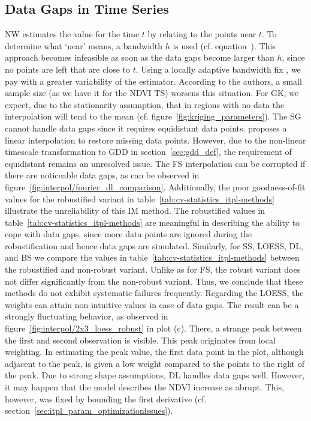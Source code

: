 {    \subsection{Data Gaps in Time Series}\label{sec:discussion_itpl_data_gaps}{
        NW estimates the value for the time $t$ by relating to the points near $t$. To determine what `near' means, a bandwidth $h$ is used (cf. equation~). This approach becomes infeasible as soon as the data gaps become larger than $h$, since no points are left that are close to $t$. Using a locally adaptive bandwidth fix \citep{brockmannLocallyAdaptiveBandwidth1993}, we pay with a greater variability of the estimator. According to the authors, a small sample size (as we have it for the NDVI TS) worsens this situation. 
        For GK, we expect, due to the stationarity assumption, that in regions with no data the interpolation will tend to the mean (cf. figure~\ref{fig:kriging_parameters}). 
        The SG cannot handle data gaps since it requires equidistant data points. \cite{chenSimpleMethodReconstructing2004a} proposes a linear interpolation to restore missing data points. However, due to the non-linear timescale transformation to GDD in section~\ref{sec:gdd_def}, the requirement of equidistant remains an unresolved issue.
        The FS interpolation can be corrupted if there are noticeable data gaps, as can be observed in figure~\ref{fig:interpol/fourier_dl_comparison}.  Additionally, the poor goodness-of-fit values for the robustified variant in table~\ref{tab:cv-statistics_itpl-methods} illustrate the unreliability of this IM method.
        The robustified values in table~\ref{tab:cv-statistics_itpl-methods} are meaningful in describing the ability to cope with data gaps, since more data points are ignored during the robustification and hence data gaps are simulated. 
        Similarly, for SS, LOESS, DL, and BS we compare the values in table~\ref{tab:cv-statistics_itpl-methods} between the robustified and non-robust variant. Unlike as for FS, the robust variant does not differ significantly from the non-robust variant. Thus, we conclude that these methods do not exhibit systematic failures frequently.
        Regarding the LOESS, the weights can attain non-intuitive values in case of data gaps. The result can be a strongly fluctuating behavior, as observed in figure~\ref{fig:interpol/2x3_loess_robust} in plot (c). There, a strange peak between the first and second observation is visible. This peak originates from local weighting. In estimating the peak value, the first data point in the plot, although adjacent to the peak, is given a low weight compared to the points to the right of the peak.
        Due to strong shape assumptions, DL handles data gaps well. However, it may happen that the model describes the NDVI increase as abrupt. This, however, was fixed by bounding the first derivative (cf. section~\ref{sec:itpl_param_optimizationissues}).
    }

}
